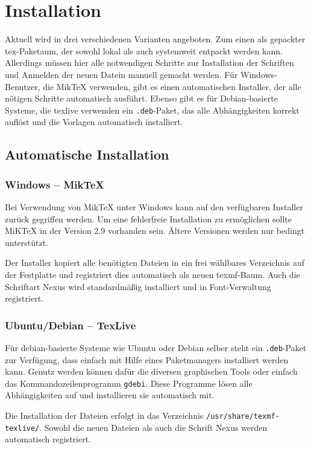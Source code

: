 \chapter{Installation}\label{chap:install}

Aktuell wird \tubslatex in drei verschiedenen Varianten angeboten.
Zum einen als gepackter tex-Paketaum, der sowohl lokal als auch systemweit
entpackt werden kann. Allerdings müssen hier alle notwendigen Schritte zur 
Installation der Schriften und Anmelden der neuen Datein manuell gemacht werden.
Für Windows-Benutzer, die MikTeX verwenden, gibt es einen automatischen
Installer, der alle nötigen Schritte automatisch ausführt.
Ebenso gibt es für Debian-basierte Systeme, die texlive verwenden ein
\texttt{.deb}-Paket, das alle Abhängigkeiten korrekt auflöst und die Vorlagen
automatisch installiert.

\section{Automatische Installation}

\subsection{Windows -- MikTeX}

Bei Verwendung von MikTeX unter Windows kann auf den verfügbaren Installer
zurück gegriffen werden. Um eine fehlerfreie Installation zu ermöglichen
sollte MiKTeX in der Version 2.9 vorhanden sein.
Ältere Versionen werden nur bedingt unterstützt.

Der Installer kopiert alle benötigten Dateien in ein frei wählbares Verzeichnis
auf der Festplatte und registriert dies automatisch als neuen texmf-Baum.
Auch die Schriftart Nexus wird standardmäßig installiert und in 
Font-Verwaltung registriert.

\subsection{Ubuntu/Debian -- TexLive}

Für debian-basierte Systeme wie Ubuntu oder Debian selber steht ein
\texttt{.deb}-Paket zur Verfügung, dass einfach mit Hilfe eines Paketmanagers
installiert werden kann.
Genutz werden können dafür die diversen graphischen Tools oder einfach das
Kommandozeilenprogramm \texttt{gdebi}. Diese Programme lösen alle Abhängigkeiten
auf und installieren sie automatisch mit.

Die Installation der Dateien erfolgt in das Verzeichnis
\lstinline{/usr/share/texmf-texlive/}. Sowohl die neuen Dateien als auch 
die Schrift Nexus werden automatisch registriert.

